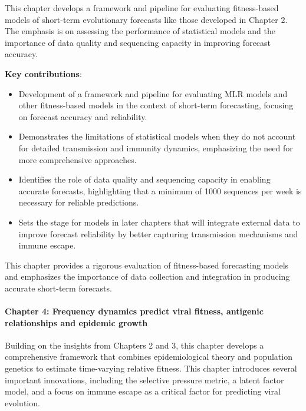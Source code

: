 This chapter develops a framework and pipeline for evaluating fitness-based models of short-term evolutionary forecasts like those developed in Chapter 2.
The emphasis is on assessing the performance of statistical models and the importance of data quality and sequencing capacity in improving forecast accuracy.

\noindent\textbf{Key contributions}:
\begin{itemize}
        \item Development of a framework and pipeline for evaluating MLR models and other fitness-based models in the context of short-term forecasting, focusing on forecast accuracy and reliability.
        \item Demonstrates the limitations of statistical models when they do not account for detailed transmission and immunity dynamics, emphasizing the need for more comprehensive approaches.
        \item Identifies the role of data quality and sequencing capacity in enabling accurate forecasts, highlighting that a minimum of 1000 sequences per week is necessary for reliable predictions.
        \item Sets the stage for models in later chapters that will integrate external data to improve forecast reliability by better capturing transmission mechanisms and immune escape.
\end{itemize}

This chapter provides a rigorous evaluation of fitness-based forecasting models and emphasizes the importance of data collection and integration in producing accurate short-term forecasts.

\paragraph{Chapter 4: Frequency dynamics predict viral fitness, antigenic relationships and epidemic growth}

Building on the insights from Chapters 2 and 3, this chapter develops a comprehensive framework that combines epidemiological theory and population genetics to estimate time-varying relative fitness. This chapter introduces several important innovations, including the selective pressure metric, a latent factor model, and a focus on immune escape as a critical factor for predicting viral evolution.

